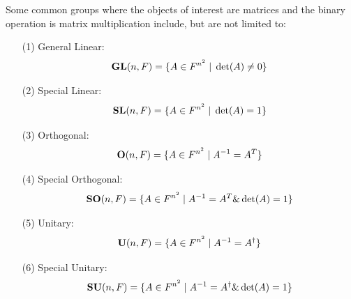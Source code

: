 \documentclass[12pt, letterpaper, onecolumn, conference, final]{IEEEtran}
\theoremstyle{definition}
\theoremstyle{plain}
\begin{document}
\noindent
Some common groups where the objects of interest are matrices and the binary operation is matrix multiplication include, but are not limited to:
\begin{center}
\begin{itemize}

\item[(1)]
General Linear:
\begin{equation*}
\textbf{GL}(n,F) = \{ A \in F^{n^2} \hspace{.1cm} | \hspace{.1cm} \det(A) \neq 0 \}
\end{equation*}

\item[(2)]
Special Linear:
\begin{equation*}
\textbf{SL}(n,F) = \{ A \in F^{n^2} \hspace{.1cm} | \hspace{.1cm} \det(A) = 1 \}
\end{equation*}

\item[(3)]
Orthogonal:
\begin{equation*}
\textbf{O}(n,F) = \{ A \in F^{n^2} \hspace{.1cm} | \hspace{.1cm} A^{-1} = A^T \}
\end{equation*}

\item[(4)]
Special Orthogonal:
\begin{equation*}
\textbf{SO}(n,F) = \{ A \in F^{n^2} \hspace{.1cm} | \hspace{.1cm} A^{-1} = A^T \& \det(A) = 1 \}
\end{equation*}

\item[(5)]
Unitary:
\begin{equation*}
\textbf{U}(n,F) = \{ A \in F^{n^2} \hspace{.1cm} | \hspace{.1cm} A^{-1} = A^\dagger \}
\end{equation*}

\item[(6)]
Special Unitary:
\begin{equation*}
\textbf{SU}(n,F) = \{ A \in F^{n^2} \hspace{.1cm} | \hspace{.1cm} A^{-1} = A^\dagger \& \det(A) = 1 \}
\end{equation*}


\end{itemize}
\end{center}
\end{document}
